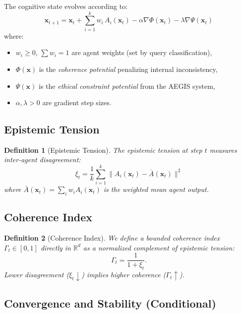 \documentclass[11pt,a4paper]{article}
\newtheorem{definition}{Definition}
\begin{document}
The cognitive state evolves according to:
\begin{equation}
\label{eq:evolution}
\mathbf{x}_{t+1} = \mathbf{x}_t + \sum_{i=1}^{k} w_i \, A_i(\mathbf{x}_t)
  - \alpha \nabla\Phi(\mathbf{x}_t) - \lambda \nabla\Psi(\mathbf{x}_t)
\end{equation}
where:
\begin{itemize}[leftmargin=*,nosep]
  \item $w_i \geq 0$, $\sum w_i = 1$ are agent weights (set by query
    classification),
  \item $\Phi(\mathbf{x})$ is the \emph{coherence potential} penalizing
    internal inconsistency,
  \item $\Psi(\mathbf{x})$ is the \emph{ethical constraint potential} from
    the AEGIS system,
  \item $\alpha, \lambda > 0$ are gradient step sizes.
\end{itemize}

\subsection{Epistemic Tension}

\begin{definition}[Epistemic Tension]
The epistemic tension at step $t$ measures inter-agent disagreement:
\begin{equation}
\label{eq:tension}
\xi_t = \frac{1}{k} \sum_{i=1}^{k}
  \| A_i(\mathbf{x}_t) - \bar{A}(\mathbf{x}_t) \|^2
\end{equation}
where $\bar{A}(\mathbf{x}_t) = \sum_{i} w_i A_i(\mathbf{x}_t)$ is the
weighted mean agent output.
\end{definition}

\subsection{Coherence Index}

\begin{definition}[Coherence Index]
We define a bounded coherence index $\Gamma_t \in [0,1]$ directly in
$\mathbb{R}^d$ as a normalized complement of epistemic tension:
\begin{equation}
\label{eq:coherence}
\Gamma_t = \frac{1}{1 + \xi_t}.
\end{equation}
Lower disagreement ($\xi_t\downarrow$) implies higher coherence
($\Gamma_t\uparrow$).
\end{definition}

\subsection{Convergence and Stability (Conditional)}
\end{document}
